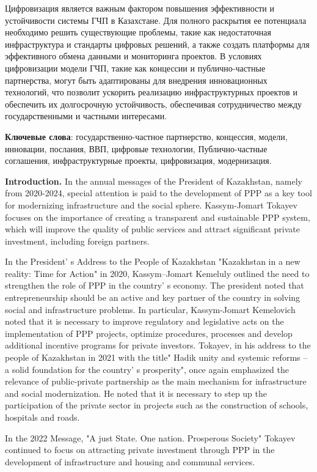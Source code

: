 Цифровизация является важным фактором повышения эффективности и
устойчивости системы ГЧП в Казахстане. Для полного раскрытия ее
потенциала необходимо решить существующие проблемы, такие как
недостаточная инфраструктура и стандарты цифровых решений, а также
создать платформы для эффективного обмена данными и мониторинга
проектов. В условиях цифровизации модели ГЧП, такие как концессии и
публично-частные партнерства, могут быть адаптированы для внедрения
инновационных технологий, что позволит ускорить реализацию
инфраструктурных проектов и обеспечить их долгосрочную устойчивость,
обеспечивая сотрудничество между государственными и частными интересами.

{\bfseries Ключевые слова}: государственно-частное партнерство, концессия,
модели, инновации, послания, ВВП, цифровые технологии, Публично-частные
соглашения, инфраструктурные проекты, цифровизация, модернизация.

{\bfseries Introduction.} In the annual messages of the President of
Kazakhstan, namely from 2020-2024, special attention is paid to the
development of PPP as a key tool for modernizing infrastructure and the
social sphere. Kassym-Jomart Tokayev focuses on the importance of
creating a transparent and sustainable PPP system, which will improve
the quality of public services and attract significant private
investment, including foreign partners.

In the President' s Address to the People of Kazakhstan
"Kazakhstan in a new reality: Time for Action" in 2020, Kassym--Jomart
Kemeluly outlined the need to strengthen the role of PPP in the
country' s economy. The president noted that
entrepreneurship should be an active and key partner of the country in
solving social and infrastructure problems. In particular, Kassym-Jomart
Kemelovich noted that it is necessary to improve regulatory and
legislative acts on the implementation of PPP projects, optimize
procedures, processes and develop additional incentive programs for
private investors. Tokayev, in his address to the people of Kazakhstan
in 2021 with the title" Hadik unity and systemic reforms -- a solid
foundation for the country' s prosperity", once again
emphasized the relevance of public-private partnership as the main
mechanism for infrastructure and social modernization. He noted that it
is necessary to step up the participation of the private sector in
projects such as the construction of schools, hospitals and roads.

In the 2022 Message, "A just State. One nation. Prosperous Society"
Tokayev continued to focus on attracting private investment through PPP
in the development of infrastructure and housing and communal services.

